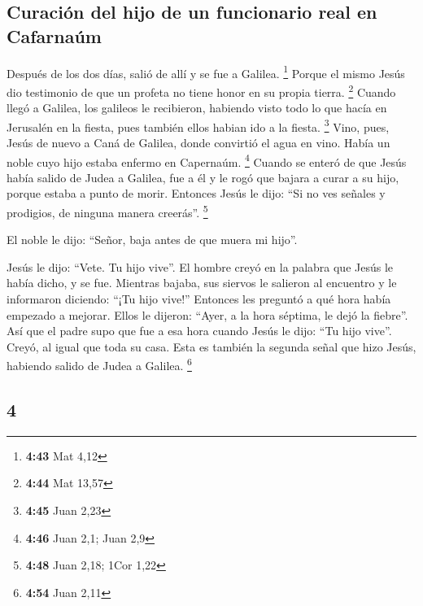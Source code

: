 \begin{paracol}{2}
\hypertarget{curaciuxf3n-del-hijo-de-un-funcionario-real-en-cafarnauxfam}{%
\subsection{Curación del hijo de un funcionario real en
Cafarnaúm}\label{curaciuxf3n-del-hijo-de-un-funcionario-real-en-cafarnauxfam}}

 Después de los dos días, salió de allí y se fue a
Galilea. \footnote{\textbf{4:43} Mat 4,12}  Porque el
mismo Jesús dio testimonio de que un profeta no tiene honor en su propia
tierra. \footnote{\textbf{4:44} Mat 13,57}  Cuando llegó
a Galilea, los galileos le recibieron, habiendo visto todo lo que hacía
en Jerusalén en la fiesta, pues también ellos habian ido a la fiesta.
\footnote{\textbf{4:45} Juan 2,23}  Vino, pues, Jesús de
nuevo a Caná de Galilea, donde convirtió el agua en vino. Había un noble
cuyo hijo estaba enfermo en Capernaúm. \footnote{\textbf{4:46} Juan 2,1;
  Juan 2,9}  Cuando se enteró de que Jesús había salido
de Judea a Galilea, fue a él y le rogó que bajara a curar a su hijo,
porque estaba a punto de morir.  Entonces Jesús le dijo:
``Si no ves señales y prodigios, de ninguna manera creerás''.
\footnote{\textbf{4:48} Juan 2,18; 1Cor 1,22}

 El noble le dijo: ``Señor, baja antes de que muera mi
hijo''.

 Jesús le dijo: ``Vete. Tu hijo vive''. El hombre creyó
en la palabra que Jesús le había dicho, y se fue. 
Mientras bajaba, sus siervos le salieron al encuentro y le informaron
diciendo: ``¡Tu hijo vive!''  Entonces les preguntó a qué
hora había empezado a mejorar. Ellos le dijeron: ``Ayer, a la hora
séptima, le dejó la fiebre''.  Así que el padre supo que
fue a esa hora cuando Jesús le dijo: ``Tu hijo vive''. Creyó, al igual
que toda su casa.  Esta es también la segunda señal que
hizo Jesús, habiendo salido de Judea a Galilea. \footnote{\textbf{4:54}
  Juan 2,11}

\switchcolumn
\begin{otherlanguage}{english}

\hypertarget{section-7}{%
\section{4}\label{section-7}}


\end{otherlanguage}
\end{paracol}
